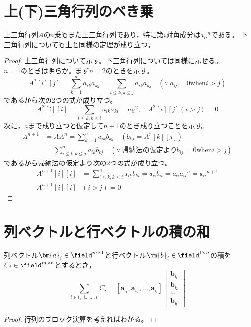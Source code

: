     \section{上(下)三角行列のべき乗}
        \label{上(下)三角行列のべき乗}
        \begin{shadebox}
            上三角行列$A$の$n$乗もまた上三角行列であり，特に第$i$対角成分は${a_{ii}}^n$である。
            下三角行列についても上と同様の定理が成り立つ。
        \end{shadebox}
        \begin{proof}
            \quad\par
            上三角行列について示す。下三角行列については同様に示せる。\\
            $n=1$のときは明らか。まず$n=2$のときを示す。
            \[A^2[i][j] = \sum_{k=1}^{n}{a_{ik}a_{kj}} = \sum_{i\leq k,k\leq j}{a_{ik}a_{kj}}\quad(\because\;a_{ij}=0\mathrm{ when }i>j)\]
            であるから次の2つの式が成り立つ。
            \[A^2[i][i] = \sum_{i\leq k,k\leq i}{a_{ik}a_{ki}} = {a_{ii}}^2,\quad A^2[i][j](i>j) = 0\]
            次に，$n$まで成り立つと仮定して$n+1$のとき成り立つことを示す。
            \begin{align*}
                A^{n+1} &= AA^n = \sum_{k=1}^{n}{a_{ik}b_{kj}}\quad\left(b_{kj} = A^n[k][j]\right) \\
                &= \sum_{i\leq k, k\leq j}^{n}{a_{ik}b_{kj}}\quad(\because\;\mathrm{帰納法の仮定より }b_{ij}=0\mathrm{ when }i>j)
            \end{align*}
            であるから帰納法の仮定より次の2つの式が成り立つ。
            \begin{align*}
                A^{n+1}[i][i] &= \sum_{i\leq k, k\leq i}^{n}{a_{ik}b_{ki}} = a_{ii}b_{ii} = a_{ii}{a_{ii}}^n = {a_{ii}}^{n+1}\\
                A^{n+1}[i][i]&(i>j) = 0
            \end{align*}
        \end{proof}
    \section{列ベクトルと行ベクトルの積の和}
        \begin{shadebox}
            列ベクトル$\bm{a}_i\in\field^{m\times1}$と行ベクトル$\bm{b}_i\in\field^{1\times n}$の積を$C_i\in\field^{m\times n}$とするとき，
            \[
            \sum_{i\in{i_1,i_2,\dotsc,i_l}}{C_i} = [\bm{a}_{i_1},\bm{a}_{i_2},\dotsc,\bm{a}_{i_l}]
            \begin{bmatrix}
                \bm{b}_{i_i}\\
                \bm{b}_{i_2}\\
                \cdots\\
                \bm{b}_{i_l}
            \end{bmatrix}
            \]
        \end{shadebox}
        \begin{proof}
            行列のブロック演算を考えればわかる。
        \end{proof}
